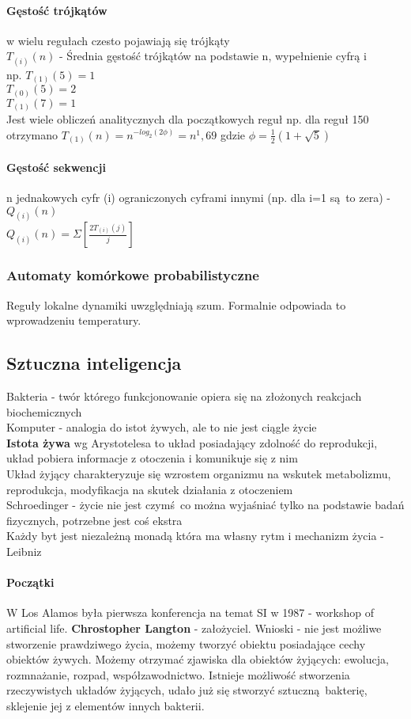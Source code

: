 \documentclass{article}
\begin{document}
		 \paragraph{Gęstość trójkątów}
		 w wielu regułach czesto pojawiają się trójkąty \\
		 $T_{(i)}(n)$ - Średnia gęstość trójkątów na podstawie n, wypełnienie cyfrą i\\
		 np. $T_(1) (5) = 1$\\
		 $T_(0) (5) = 2$ \\
		 $T_(1) (7) = 1$ \\
		 Jest wiele obliczeń analitycznych dla początkowych reguł np. dla reguł 150 otrzymano $T_(1) (n) = n^{-log_2(2\phi)}=n^1,69$ gdzie $\phi = \frac{1}{2}(1+\sqrt{5})$
		 \paragraph{Gęstość sekwencji}
		 n jednakowych cyfr (i) ograniczonych cyframi innymi (np. dla i=1 są to zera) - $Q_{(i)} (n)$ \\
		 $Q_{(i)}(n) = \Sigma[\frac{2T_(i)(j)}{j}]$ 
		 \subsubsection{Automaty komórkowe probabilistyczne}
			 Reguły lokalne dynamiki uwzględniają szum. Formalnie odpowiada to wprowadzeniu temperatury. \\ 
		\subsection{Sztuczna inteligencja}
			Bakteria - twór którego funkcjonowanie opiera się na złożonych reakcjach biochemicznych \\
			Komputer - analogia do istot żywych, ale to nie jest ciągle życie \\
			\textbf{Istota żywa} wg Arystotelesa to układ posiadający zdolność do reprodukcji, układ pobiera informacje z otoczenia i komunikuje się z nim\\
			Układ żyjący charakteryzuje się wzrostem organizmu na wskutek metabolizmu, reprodukcja, modyfikacja na skutek działania z otoczeniem \\
			Schroedinger - życie nie jest czymś co można wyjaśniać tylko na podstawie badań fizycznych, potrzebne jest coś ekstra \\
			Każdy byt jest niezależną monadą która ma własny rytm i mechanizm życia - Leibniz
			\paragraph{Początki} W Los Alamos była pierwsza konferencja na temat SI w 1987 - workshop of artificial life. 
			\textbf{Chrostopher Langton} - założyciel. 
			Wnioski - nie jest możliwe stworzenie prawdziwego życia, możemy tworzyć obiektu posiadające cechy obiektów żywych. Możemy otrzymać zjawiska dla obiektów żyjących: ewolucja, rozmnażanie, rozpad, współzawodnictwo. Istnieje możliwość stworzenia rzeczywistych układów żyjących, udało już się stworzyć sztuczną bakterię, sklejenie jej z elementów innych bakterii.\\
\end{document}
